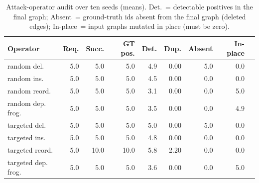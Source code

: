 \begin{table}[t]
\centering
\caption{Attack-operator audit over ten seeds (means). Det.\ = detectable positives in the final graph; Absent\ = ground-truth ids absent from the final graph (deleted edges); In-place\ = input graphs mutated in place (must be zero).}
\label{tab:operators}
{\small
\begin{tabular}{p{3.0cm}rrrrrrrr}
\toprule
Operator & Req. & Succ. & GT pos. & Det. & Dup. & Absent & In-place \\
\midrule
random del. & 5.0 & 5.0 & 5.0 & 4.9 & 0.00 & 5.0 & 0.0 \\
random ins. & 5.0 & 5.0 & 5.0 & 4.5 & 0.00 & 0.0 & 0.0 \\
random reord. & 5.0 & 5.0 & 5.0 & 3.1 & 0.00 & 0.0 & 5.0 \\
random dep. frog. & 5.0 & 5.0 & 5.0 & 3.5 & 0.00 & 0.0 & 4.9 \\
targeted del. & 5.0 & 5.0 & 5.0 & 5.0 & 0.00 & 5.0 & 0.0 \\
targeted ins. & 5.0 & 5.0 & 5.0 & 4.8 & 0.00 & 0.0 & 0.0 \\
targeted reord. & 5.0 & 10.0 & 10.0 & 5.8 & 2.20 & 0.0 & 0.0 \\
targeted dep. frog. & 5.0 & 5.0 & 5.0 & 3.6 & 0.00 & 0.0 & 5.0 \\
\bottomrule
\end{tabular}
}
\end{table}
